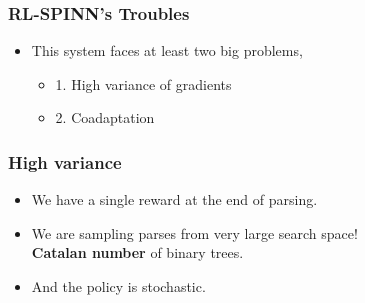 \begin{frame}
\frametitle{RL-SPINN's Troubles}
\begin{itemize}
\item[] This system faces at least two big problems,
\begin{itemize}
\item<2->[] {\large 1. High variance of gradients}
\item<2->[] {\large 2. Coadaptation}
\end{itemize}
\end{itemize}
\end{frame}


\begin{frame}
\frametitle{High variance}

\begin{itemize}
\item We have a single reward at the end of parsing.
\item<2-> We are sampling parses from very large search space!\\ \textbf{Catalan number} of binary trees.
\item<4-> And the policy is stochastic.
\end{itemize}
\end{frame}


